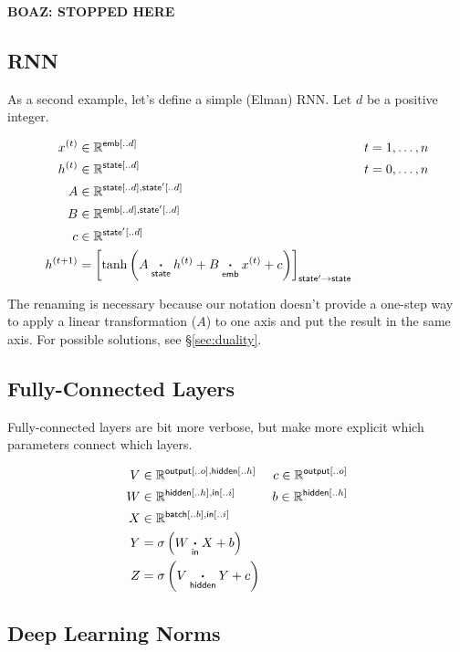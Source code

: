 \documentclass{article}
\newcommand{\reals}{\mathbb{R}}
\begin{document}
\textbf{BOAZ: STOPPED HERE}


\subsection{RNN}
\label{sec:rnn}

As a second example, let's define a simple (Elman) RNN. Let $d$ be a positive integer.

\begin{align*}
x^{(t)} &\in \mathbb{R}^{\nset{emb}{..d}} & t &= 1, \ldots, n \\
h^{(t)} &\in \mathbb{R}^{\nset{state}{..d}} & t &= 0, \ldots, n\\
A &\in \mathbb{R}^{\nset{state}{..d}, \nset{state'}{..d}} \\
B &\in \mathbb{R}^{\nset{emb}{..d}, \nset{state'}{..d}} \\
c &\in \mathbb{R}^{\nset{state'}{..d}} \\
h^{(t+1)} &= \nmov{state'}{state}{\tanh\left( A \ndot{state} h^{(t)} + B \ndot{emb} x^{(t)} + c \right)}
\end{align*}

The renaming is necessary because our notation doesn't provide a one-step way to apply a linear transformation ($A$) to one axis and put the result in the same axis. For possible solutions, see \S\ref{sec:duality}.

\subsection{Fully-Connected Layers}

Fully-connected layers are bit more verbose, but make more explicit which parameters connect which layers.

\begin{align*} 
V &\in \reals^{\nset{output}{..o}, \nset{hidden}{..h}} & c\in \reals^{\nset{output}{..o}} \\
W &\in \reals^{{\nset{hidden}{..h}, \nset{in}{..i}}} & b \in \reals^{\nset{hidden}{..h}} \\
X &\in \reals^{{\nset{batch}{..b}, \nset{in}{..i}}} \\
Y &= \sigma \left( W \ndot{in} X + b \right) \\
Z &= \sigma \left( V \ndot{hidden} Y + c \right)  
\end{align*}

\subsection{Deep Learning Norms}
\end{document}
